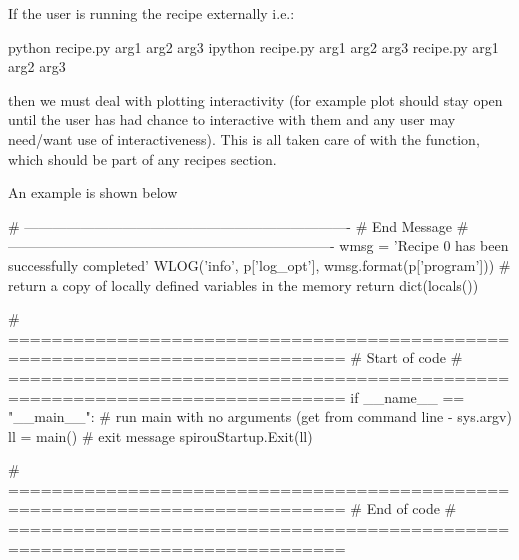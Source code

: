 If the user is running the recipe externally i.e.:
\begin{cmdbox}
python recipe.py arg1 arg2 arg3
ipython recipe.py arg1 arg2 arg3
recipe.py arg1 arg2 arg3
\end{cmdbox}
\noindent then we must deal with plotting interactivity (for example plot should stay open until the user has had chance to interactive with them and any user may need/want use of interactiveness). This is all taken care of with the \spirouStartup{} function, which should be part of any recipes  section. \\

\vspace{0.5cm}
\begin{minipage}{\textwidth}
\noindent An example is shown below
\begin{pythonbox}
# ----------------------------------------------------------------------
# End Message
# ----------------------------------------------------------------------
wmsg = 'Recipe {0} has been successfully completed'
WLOG('info', p['log_opt'], wmsg.format(p['program']))
    # return a copy of locally defined variables in the memory
    return dict(locals())

# =============================================================================
# Start of code
# =============================================================================
if __name__ == "__main__":
    # run main with no arguments (get from command line - sys.argv)
    ll = main()
    # exit message
    spirouStartup.Exit(ll)

# =============================================================================
# End of code
# =============================================================================
\end{pythonbox}
\end{minipage}

\clearpage
\newpage
\fi